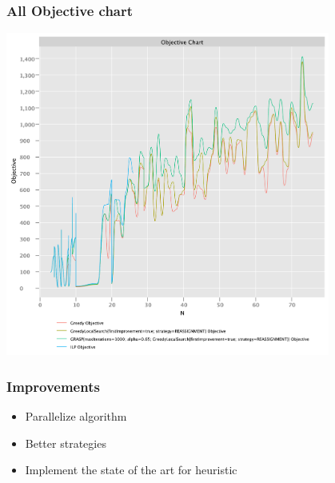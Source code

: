 \documentclass{beamer}
\begin{document}
\begin{frame}
\frametitle{All Objective chart}
\includegraphics[width=0.8\textwidth]{./documentation/assets/new.all.objectiveChart.pdf}
\end{frame}

\begin{frame}
\frametitle{Improvements}
\begin{itemize}
    \item Parallelize algorithm
    \item Better strategies
    \item Implement the state of the art for heuristic
\end{itemize}
\end{frame}
\end{document}
